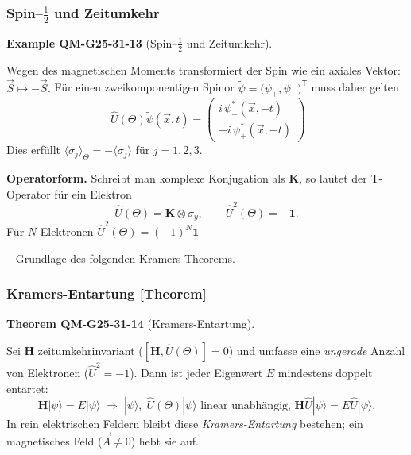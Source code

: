 \documentclass[10pt, letterpaper]{article}
\newcommand{\CustomHeading}[3]{%
  \par\medskip\noindent%
  \textbf{#1 #2} \textnormal{(#3)}.\enskip%
}
\newenvironment{THEO}[2]{\begin{unitbox}\CustomHeading{Theorem}{#1}{#2}}{\end{unitbox}}
\newenvironment{EXA}[2]{\begin{unitbox}\CustomHeading{Example}{#1}{#2}}{\end{unitbox}}
\begin{document}
\subsubsection*{Spin–$\frac{1}{2}$ und Zeitumkehr}

\begin{EXA}{QM-G25-31-13}{Spin–$\frac{1}{2}$ und Zeitumkehr}
Wegen des magnetischen Moments transformiert der Spin wie
ein axiales Vektor:
\(
  \vec S\mapsto -\vec S.
\)
Für einen zweikomponentigen Spinor
\(
  \tilde\psi
  =\bigl(\psi_{+},\psi_{-}\bigr)^{\mathsf T}
\)
muss daher gelten
\[
  \boxed{\;
    \widehat U(\Theta)\tilde\psi(\vec x,t)
    =\begin{pmatrix}
       i\,\psi_{-}^{*}(\vec x,-t)\\[2pt]
      -i\,\psi_{+}^{*}(\vec x,-t)
     \end{pmatrix}}
\]
Dies erfüllt
\(
  \langle\sigma_j\rangle_{\Theta}
  =-\langle\sigma_j\rangle
\)
für $j=1,2,3$.

\textbf{Operatorform.}
Schreibt man komplexe Konjugation als
\(\mathbf K\),
so lautet der T-Operator für ein Elektron
\[
  \widehat U(\Theta)
  =\mathbf K\otimes\sigma_y ,
  \qquad
  \widehat U^{2}(\Theta)=-\mathbf 1 .
\]
Für $N$ Elektronen
\(
  \widehat U^{2}(\Theta)=(-1)^N\mathbf 1
\)

– Grundlage des folgenden Kramers-Theorems.
\end{EXA}

\subsubsection*{Kramers-Entartung [Theorem]}

\begin{THEO}{QM-G25-31-14}{Kramers-Entartung}
Sei $\mathbf H$ zeitumkehrinvariant (\(\![\mathbf H,\widehat U(\Theta)]=0\!\))
und umfasse eine \emph{ungerade} Anzahl von Elektronen
($\widehat U^{2}=-1$).
Dann ist jeder Eigenwert $E$ mindestens doppelt entartet:
\[
  \mathbf H|\psi\rangle =E|\psi\rangle
  \;\Longrightarrow\;
  |\psi\rangle,\;
  \widehat U(\Theta)|\psi\rangle
  \text{ linear unabhängig, }
  \mathbf H\widehat U|\psi\rangle =E\widehat U|\psi\rangle.
\]
In rein elektrischen Feldern bleibt diese
\emph{Kramers-Entartung} bestehen;  
ein magnetisches Feld (\(\vec A\neq0\)) hebt sie auf.
\end{THEO}

\end{document}
